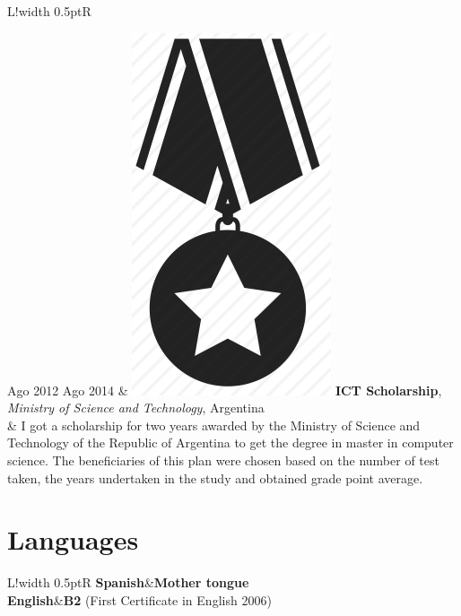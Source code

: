\documentclass[10pt]{article}
\newcommand\VRule{\color{lightgray}\vrule width 0.5pt}
\begin{document}
\begin{tabular}{L!{\VRule}R}

Ago 2012 Ago 2014 & \includegraphics[scale=0.022]{img/medal.png}
\textbf{ICT Scholarship}, \textit{Ministry of Science and 
Technology}, Argentina\\
& \vspace{-0.7cm} I got a scholarship for two years awarded by the Ministry of 
Science and Technology of the Republic of Argentina to
get the degree in master in computer science. The beneficiaries of this plan were chosen based on the number of test
taken, the years undertaken in the study and obtained grade point average.\\
\end{tabular}



\section*{Languages}

\begin{tabular}{L!{\VRule}R}
{\bf Spanish}&{\bf Mother tongue}\\
{\bf English}&{\bf B2} (First Certificate in English 2006)\\
\end{tabular}
\end{document}
